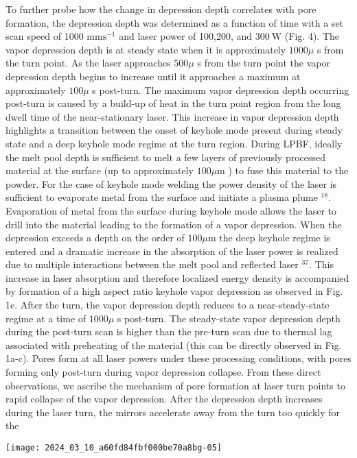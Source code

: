 \documentclass[10pt]{article}
\begin{document}
To further probe how the change in depression depth correlates with pore formation, the depression depth was determined as a function of time with a set scan speed of 1000 $\mathrm{mm} \mathrm{s}^{-1}$ and laser power of 100,200, and $300 \mathrm{~W}$ (Fig. 4). The vapor depression depth is at steady state when it is approximately $1000 \mu$ s from the turn point. As the laser approaches $500 \mu$ s from the turn point the vapor depression depth begins to increase until it approaches a maximum at approximately $100 \mu$ s post-turn. The maximum vapor depression depth occurring post-turn is caused by a build-up of heat in the turn point region from the long dwell time of the near-stationary laser. This increase in vapor depression depth highlights a transition between the onset of keyhole mode present during steady state and a deep keyhole mode regime at the turn region. During LPBF, ideally the melt pool depth is sufficient to melt a few layers of previously processed material at the surface (up to approximately $100 \mu \mathrm{m}$ ) to fuse this material to the powder. For the case of keyhole mode welding the power density of the laser is sufficient to evaporate metal from the surface and initiate a plasma plume ${ }^{18}$. Evaporation of metal from the surface during keyhole mode allows the laser to drill into the material leading to the formation of a vapor depression. When the depression exceeds a depth on the order of $100 \mu \mathrm{m}$ the deep keyhole regime is entered and a dramatic increase in the absorption of the laser power is realized due to multiple interactions between the melt pool and reflected laser ${ }^{37}$. This increase in laser absorption and therefore localized energy density is accompanied by formation of a high aspect ratio keyhole vapor depression as observed in Fig. 1e. After the turn, the vapor depression depth reduces to a near-steady-state regime at a time of $1000 \mu$ s post-turn. The steady-state vapor depression depth during the post-turn scan is higher than the pre-turn scan due to thermal lag associated with preheating of the material (this can be directly observed in Fig. 1a-c). Pores form at all laser powers under these processing conditions, with pores forming only post-turn during vapor depression collapse. From these direct observations, we ascribe the mechanism of pore formation at laser turn points to rapid collapse of the vapor depression. After the depression depth increases during the laser turn, the mirrors accelerate away from the turn too quickly for the

\begin{center}
\texttt{[image: 2024\_03\_10\_a60fd84fbf000be70a8bg-05]}
\end{center}
\end{document}
